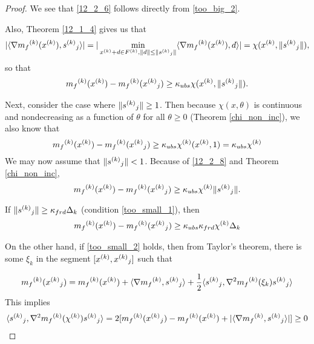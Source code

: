 \documentclass{article}
\begin{document}
\begin{proof}

We see that \ref{12_2_6} follows directly from \ref{too_big_2}.

Also, Theorem \ref{12_1_4} gives us that
\begin{align}
|\langle \nabla {{m}_f}^{(k)}({x}^{(k)}), {{s}^{(k)}}_{j} \rangle| =  | \min_{{x}^{(k)}+d \in {F}^{(k)}, \|d\| \le \|{{s}^{(k)}}_{j}\|}\langle \nabla{{m}_f}^{(k)}({x}^{(k)}), d\rangle| = \chi({x}^{(k)}, \|{{s}^{(k)}}_{j}\|),
\end{align}
so that
\begin{align}
\label{12_2_8}
{{m}_f}^{(k)}({x}^{(k)}) - {{m}_f}^{(k)}({{x}^{(k)}}_{j}) \ge \kappa_{ubs}\chi({x}^{(k)}, \|{{s}^{(k)}}_{j}\|).
\end{align}

Next, consider the case where $\|{{s}^{(k)}}_{j}\| \ge 1$.
Then because $\chi(x, \theta)$ is continuous and nondecreasing as a function of $\theta$ for all $\theta \ge 0$ (Theorem \ref{chi_non_inc}),
we also know that
\[
{{m}_f}^{(k)}({x}^{(k)})-{{m}_f}^{(k)}({{x}^{(k)}}_{j}) \ge \kappa_{ubs}{\chi^{(k)}}({x}^{(k)}, 1) = \kappa_{ubs}{\chi^{(k)}}
\]
We may now assume that $\|{{s}^{(k)}}_{j}\| < 1$.
Because of \ref{12_2_8} and Theorem \ref{chi_non_inc}, 
\[
{{m}_f}^{(k)}({x}^{(k)}) - {{m}_f}^{(k)}({{x}^{(k)}}_{j}) \ge \kappa_{ubs}{\chi^{(k)}}\|{{s}^{(k)}}_{j}\|.
\]

If $\|{{s}^{(k)}}_{j}\| \ge \kappa_{frd}\Delta_k$ (condition \ref{too_small_1}), then
\begin{align}
{{m}_f}^{(k)}({x}^{(k)}) - {{m}_f}^{(k)}({{x}^{(k)}}_{j}) \ge \kappa_{ubs}\kappa_{frd}{\chi^{(k)}} \Delta_k
\end{align}

On the other hand, if \ref{too_small_2} holds, then from Taylor's theorem, there is some $\xi_k$ in the segment $[{x}^{(k)}, {{x}^{(k)}}_{j}]$ such that

\[
{{m}_f}^{(k)}({{x}^{(k)}}_{j}) = {{m}_f}^{(k)}({x}^{(k)})  + \langle \nabla{{m}_f}^{(k)}, {{s}^{(k)}}_{j} \rangle + \frac 1 2 \langle {{s}^{(k)}}_{j}, \nabla^2{{m}_f}^{(k)}(\xi_k){{s}^{(k)}}_{j}\rangle
\]
This implies
\begin{align}
\langle {{s}^{(k)}}_{j}, \nabla^2 {{m}_f}^{(k)}({\chi^{(k)}}){{s}^{(k)}}_{j} \rangle = 2 [{{m}_f}^{(k)}({{x}^{(k)}}_{j}) - {{m}_f}^{(k)}({x}^{(k)}) + |\langle \nabla{{m}_f}^{(k)}, {{s}^{(k)}}_{j}\rangle|] \ge 0
\end{align}


\end{proof}
\end{document}
